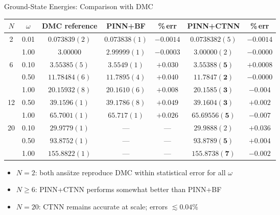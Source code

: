 \documentclass[aspectratio=169,10pt]{beamer}
\begin{document}
\begin{frame}{Ground-State Energies: Comparison with DMC}
  \scriptsize
  \renewcommand{\arraystretch}{1.20}
  \begin{tabular}{c|c|c|cc|cc}
    \toprule
    $N$ & $\omega$ & DMC reference & PINN+BF & \%\,err & PINN+CTNN & \%\,err \\
    \midrule
    2 & 0.01  & $0.073839(2)$  & $0.073838(1)$ & $-0.0014$ & $0.0738382(5)$ & $-0.0014$ \\
      & 1.00  & $3.00000$      & $2.99999(1)$  & $-0.0003$ & $3.00000(2)$   & $-0.0000$ \\
    \midrule
    6 & 0.10  & $3.55385(5)$   & $3.5549(1)$   & $+0.030$  & $\mathbf{3.55388(5)}$ & $+0.0008$ \\
      & 0.50  & $11.78484(6)$  & $11.7895(4)$  & $+0.040$  & $\mathbf{11.7847(2)}$ & $-0.0000$ \\
      & 1.00  & $20.15932(8)$  & $20.1610(6)$  & $+0.008$  & $\mathbf{20.1585(3)}$ & $-0.004$  \\
    \midrule
    12& 0.50  & $39.1596(1)$   & $39.1786(8)$  & $+0.049$  & $\mathbf{39.1604(3)}$ & $+0.002$  \\
      & 1.00  & $65.7001(1)$   & $65.717(1)$   & $+0.026$  & $\mathbf{65.69556(5)}$& $-0.007$  \\
    \midrule
    20& 0.10  & $29.9779(1)$   & ---           & ---       & $29.9888(2)$          & $+0.036$  \\
      & 0.50  & $93.8752(1)$   & ---           & ---       & $\mathbf{93.8789(5)}$ & $+0.004$  \\
      & 1.00  & $155.8822(1)$  & ---           & ---       & $\mathbf{155.8738(7)}$& $-0.002$  \\
    \bottomrule
  \end{tabular}
  \normalsize

  \vspace{0.25cm}
  \begin{itemize}
    \item $N=2$: both ans\"atze reproduce DMC within statistical error for
          all $\omega$
    \item $N\ge6$: PINN+CTNN performs somewhat better  than PINN+BF
    \item $N=20$: CTNN remains accurate at scale; errors $\lesssim 0.04\%$
  \end{itemize}
\end{frame}
\end{document}
